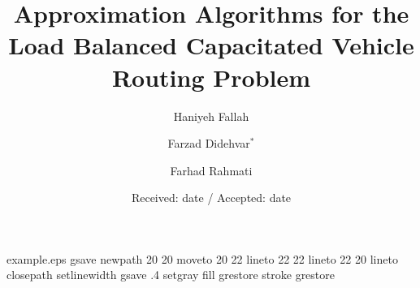 \begin{filecontents*}{example.eps}
gsave
newpath
  20 20 moveto
  20 22 lineto
  22 22 lineto
  22 20 lineto
closepath
setlinewidth
gsave
  .4 setgray fill
 grestore
stroke
grestore
\end{filecontents*}
\RequirePackage{fix-cm}

\documentclass[smallextended]{svjour3}       \smartqed  \raggedbottom
\usepackage{amssymb}
\usepackage{graphicx}
\usepackage[inner=2.5cm,outer=2cm]{geometry}
\usepackage{algorithm}
\usepackage{algpseudocode}
\usepackage{algpascal}


\title{Approximation Algorithms for the Load Balanced Capacitated Vehicle Routing Problem}





\author{Haniyeh Fallah  \and
        Farzad Didehvar$^*$  \and
        Farhad Rahmati  }





\date{Received: date / Accepted: date}



